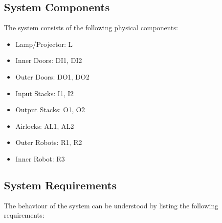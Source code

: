 \documentclass[a4paper,12pt]{article}
\begin{document}
\subsection{System Components}
The system consists of the following physical components:
\begin{itemize}
\item Lamp/Projector: L
\item Inner Doors: DI1, DI2
\item Outer Doors: DO1, DO2
\item Input Stacks: I1, I2
\item Output Stacks: O1, O2
\item Airlocks: AL1, AL2
\item Outer Robots: R1, R2
\item Inner Robot: R3
\end{itemize}


\subsection{System Requirements}
The behaviour of the system can be understood by listing the following requirements:
\end{document}
